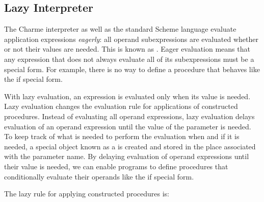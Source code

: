 \begin{schemeregion}
\subsection{Lazy Interpreter}
The Charme interpreter as well as the standard Scheme language evaluate application expressions \emph{eagerly}: all operand subexpressions are evaluated whether or not their values are needed.  This is known as . Eager evaluation means that any expression that does not always evaluate all of its subexpressions must be a special form.  For example, there is no way to define a procedure that behaves like the if special form.


With lazy evaluation, an expression is evaluated only when its value is needed.  Lazy evaluation changes the evaluation rule for applications of constructed procedures.  Instead of evaluating all operand expressions, lazy evaluation delays evaluation of an operand expression until the value of the parameter is needed.  To keep track of what is needed to perform the evaluation when and if it is needed, a special object known as a  is created and stored in the place associated with the parameter name.  By delaying evaluation of operand expressions until their value is needed, we can enable programs to define procedures that conditionally evaluate their operands like the if special form.  


The lazy rule for applying constructed procedures is:


\end{schemeregion}
